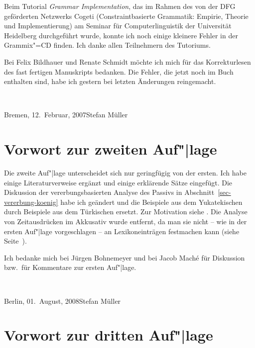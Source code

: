 Beim Tutorial \emph{Grammar Implementation}, das im Rahmen des von der DFG geförderten Netzwerks
Cogeti (Constraintbasierte Grammatik: Empirie, Theorie und Implementierung) am Seminar für
Computerlinguistik der Universität Heidelberg durchgeführt wurde,
konnte ich noch einige kleinere Fehler in der Grammix"=CD finden. Ich danke allen Teilnehmern des Tutoriums.

Bei Felix Bildhauer und Renate Schmidt möchte ich mich für das Korrekturlesen des fast fertigen
Manuskripts bedanken. Die Fehler, die jetzt noch im Buch enthalten sind, habe ich gestern bei
letzten Änderungen reingemacht.

~\medskip

\noindent
Bremen, 12.\ Februar, 2007\hfill Stefan Müller

\section*{Vorwort zur zweiten Auf"|lage}

Die zweite Auf"|lage unterscheidet sich nur geringfügig von der ersten. Ich habe einige
Literaturverweise ergänzt und einige erklärende Sätze eingefügt. Die Diskussion der
vererbungsbasierten Analyse des Passivs in Abschnitt~\ref{sec-vererbung-koenig} habe ich geändert und
die Beispiele aus dem Yukatekischen durch Beispiele aus dem Türkischen
ersetzt. Zur Motivation siehe . Die Analyse von Zeitausdrücken im
Akkusativ wurde entfernt, da man sie nicht -- wie in der ersten Auf"|lage vorgeschlagen -- an Lexikoneinträgen festmachen kann 
(siehe Seite~\pageref{bsp-den-groessten-Teil-der-Woche}).

Ich bedanke mich bei Jürgen Bohnemeyer und bei Jacob Maché für Diskussion bzw.\ für Kommentare zur
ersten Auf"|lage.

~\medskip

\noindent
Berlin, 01.\ August, 2008\hfill Stefan Müller

\section*{Vorwort zur dritten Auf"|lage}

